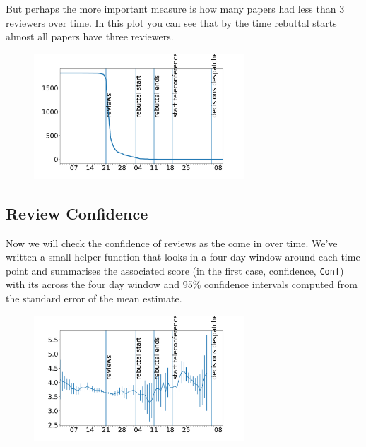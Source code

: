 But perhaps the more important measure is how many papers had less than
3 reviewers over time. In this plot you can see that by the time
rebuttal starts almost all papers have three reviewers.

\begin{Shaded}
\begin{Highlighting}[]
\OperatorTok{=}\OperatorTok{=}
\OperatorTok{=}\OperatorTok{\textless{}}\NormalTok{()}
\end{Highlighting}
\end{Shaded}

\begin{figure}[htb]
\includegraphics[width=0.70\textwidth]{diagrams/neurips/paper-short-reviews.pdf}


\caption{}
\label{paper-short-reviews}
\end{figure}

\hypertarget{review-confidence}{%
\subsection{Review Confidence}\label{review-confidence}}

Now we will check the confidence of reviews as the come in over time.
We've written a small helper function that looks in a four day window
around each time point and summarises the associated score (in the first
case, confidence, \texttt{Conf}) with its across the four day window and
95\% confidence intervals computed from the standard error of the mean
estimate.

\begin{figure}[htb]
\includegraphics[width=0.70\textwidth]{diagrams/neurips/review-confidence-time.pdf}


\caption{}
\label{review-confidence-time}
\end{figure}

